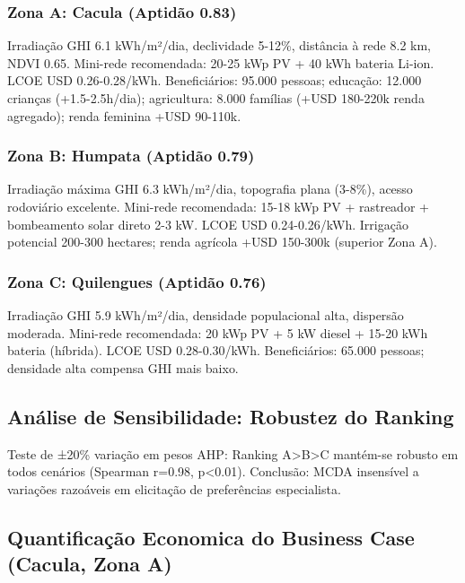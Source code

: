 \documentclass[12pt, a4paper]{article}
\begin{document}
\subsubsection{Zona A: Cacula (Aptidão 0.83)}

Irradiação GHI 6.1 kWh/m²/dia, declividade 5-12\%, distância à rede 8.2 km, NDVI 0.65. Mini-rede recomendada: 20-25 kWp PV + 40 kWh bateria Li-ion. LCOE USD 0.26-0.28/kWh. Beneficiários: 95.000 pessoas; educação: 12.000 crianças (+1.5-2.5h/dia); agricultura: 8.000 famílias (+USD 180-220k renda agregado); renda feminina +USD 90-110k.

\subsubsection{Zona B: Humpata (Aptidão 0.79)}

Irradiação máxima GHI 6.3 kWh/m²/dia, topografia plana (3-8\%), acesso rodoviário excelente. Mini-rede recomendada: 15-18 kWp PV + rastreador + bombeamento solar direto 2-3 kW. LCOE USD 0.24-0.26/kWh. Irrigação potencial 200-300 hectares; renda agrícola +USD 150-300k (superior Zona A).

\subsubsection{Zona C: Quilengues (Aptidão 0.76)}

Irradiação GHI 5.9 kWh/m²/dia, densidade populacional alta, dispersão moderada. Mini-rede recomendada: 20 kWp PV + 5 kW diesel + 15-20 kWh bateria (híbrida). LCOE USD 0.28-0.30/kWh. Beneficiários: 65.000 pessoas; densidade alta compensa GHI mais baixo.

\subsection{Análise de Sensibilidade: Robustez do Ranking}

Teste de ±20\% variação em pesos AHP: Ranking A>B>C mantém-se robusto em todos cenários (Spearman r=0.98, p<0.01). Conclusão: MCDA insensível a variações razoáveis em elicitação de preferências especialista.

\subsection{Quantificação Economica do Business Case (Cacula, Zona A)}
\end{document}

